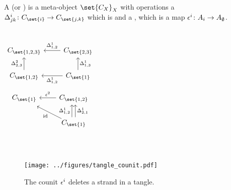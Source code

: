 \documentclass{beamer}
\begin{document}
\begin{frame}
        \begin{definition}
                A  (or ) is a meta-object
                $\set{C_X}_X$ with operations a 
                $\map {\comult^{i}_{jk}} {C_{\set{i}}} {C_{\set{j,k}}}$ which is
                 and a , which is a
                map $\map {\counit^{i}} {A_{i}} {A_{\emptyset}}$.
        \end{definition}
        \begin{columns}
        \begin{equation*}\label{eq:cd_comult}
        \begin{tikzcd}[ampersand replacement=\&]
                C_{\set{1,2,3}}
                \&C_{\set{2,3}}
                        \lar["\comult^{1}_{{1,2}}"'] \\
                C_{\set{1,2}}
                        \uar["\comult^{2}_{2,3}"]
                \&C_{\set{1}}
                        \lar["\comult^{1}_{1,2}"]
                        \uar["\comult^{1}_{1,3}"']
        \end{tikzcd}
        \end{equation*}
        \begin{equation*}\label{eq:cd_counit}
        \begin{tikzcd}[ampersand replacement=\&]
                C_{\set{1}}
                \&C_{\set{1,2}}
                        \lar["\counit^{2}"']\\
                \&C_{\set{1}}
                        \ular["\id", shift left]
                        \uar["\comult^{1}_{1,2}", shift left]
                        \uar["\comult^{1}_{2,1}"', shift right] \\
        \end{tikzcd}
        \end{equation*}
        \end{columns}
\end{frame}

\begin{frame}
        \begin{figure}
                \centering
                \texttt{[image: ../figures/tangle\_counit.pdf]}
                \caption{The counit $\epsilon^i$ deletes a strand in a tangle.}
                \label{fig:tangle_counit}
        \end{figure}
\end{frame}
\end{document}

